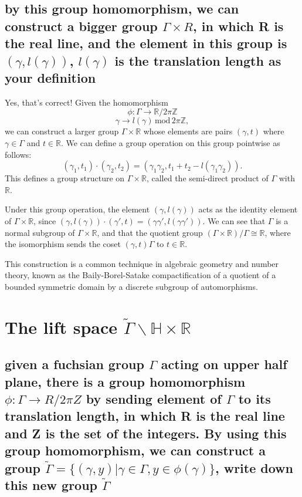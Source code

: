 \documentclass[12pt,a4paper,english]{article}
\theoremstyle{plain}
\theoremstyle{definition}
\theoremstyle{remark}
\begin{document}
\subsection{by this group homomorphism, we can construct a bigger group $\Gamma\times R$, in which R is the real line, and the element in this group is $(\gamma, l(\gamma))$, $l(\gamma)$ is the translation length as your definition}
Yes, that's correct! Given the homomorphism $$\phi : \Gamma \rightarrow \mathbb{R}/2\pi\mathbb{Z}$$ $$\gamma \rightarrow l(\gamma) \, \mathrm{mod} \, 2\pi\mathbb{Z},$$ we can construct a larger group $\Gamma\times\mathbb{R}$ whose elements are pairs $(\gamma, t)$ where $\gamma\in\Gamma$ and $t\in\mathbb{R}$. We can define a group operation on this group pointwise as follows: $$(\gamma_1, t_1)\cdot(\gamma_2, t_2) = (\gamma_1\gamma_2, t_1+t_2-l(\gamma_1\gamma_2)).$$ This defines a group structure on $\Gamma\times\mathbb{R}$, called the semi-direct product of $\Gamma$ with $\mathbb{R}$.

Under this group operation, the element $(\gamma, l(\gamma))$ acts as the identity element of $\Gamma\times\mathbb{R}$, since $(\gamma, l(\gamma))\cdot(\gamma', t)=(\gamma\gamma', l(\gamma\gamma'))$. We can see that $\Gamma$ is a normal subgroup of $\Gamma\times\mathbb{R}$, and that the quotient group $(\Gamma\times\mathbb{R})/\Gamma\cong\mathbb{R}$, where the isomorphism sends the coset $(\gamma, t)\Gamma$ to $t\in\mathbb{R}$.

This construction is a common technique in algebraic geometry and number theory, known as the Baily-Borel-Satake compactification of a quotient of a bounded symmetric domain by a discrete subgroup of automorphisms.

\section{The lift space $\tilde{\Gamma}\backslash \mathbb{H}\times \mathbb{R}$}
\subsection{given a fuchsian group $\Gamma$ acting on upper half plane, there is a group homomorphism $\phi: \Gamma \to R/2\pi Z$ by sending element of $\Gamma$ to its translation length, in which R is the real line and Z is the set of the integers. By using this group homomorphism, we can construct a group $\tilde{\Gamma}=\{(\gamma,y)| \gamma\in \Gamma, y\in \phi(\gamma)\}$, write down this new group $\tilde{\Gamma }$}
\end{document}
